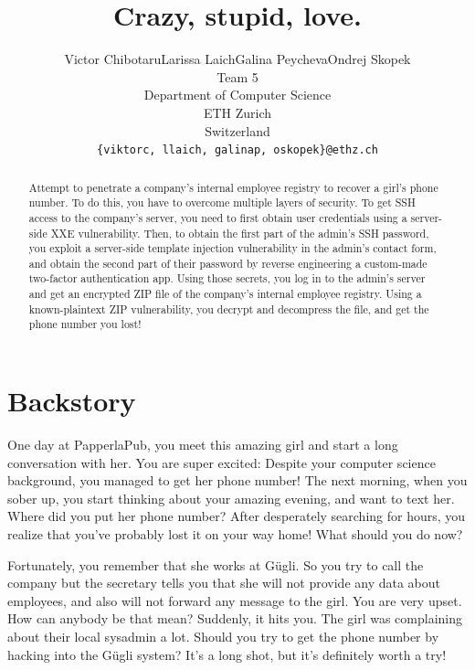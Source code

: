 \documentclass[11pt, a4paper]{article}
\begin{document}
\title{Crazy, stupid, love.}
\author{Victor Chibotaru\quad Larissa Laich\quad Galina Peycheva\quad Ondrej Skopek\\
  Team 5\\
  Department of Computer Science\\
  ETH Zurich\\
  Switzerland\\
  \texttt{\{viktorc, llaich, galinap, oskopek\}@ethz.ch}
}
\maketitle
\begin{abstract}
    Attempt to penetrate a company's internal employee registry to
    recover a girl's phone number. To do this, you have to overcome
    multiple layers of security.
	To get SSH access to the company's
    server, you need to first obtain user credentials using a server-side XXE
    vulnerability. Then, to obtain the first part of the admin's SSH password, you
    exploit a server-side template injection vulnerability in the
    admin's contact form, and obtain the second part of their password by
    reverse engineering a custom-made two-factor authentication app.
 	Using those secrets, you log in to the admin's server
    and get an encrypted ZIP file of the company's internal employee
    registry. Using a known-plaintext ZIP vulnerability, you
    decrypt and decompress the file, and get the phone number you lost!
\end{abstract}


\section{Backstory}

One day at PapperlaPub, you meet this amazing girl and start a long
conversation with her. You are super excited: Despite your computer
science background, you managed to get her phone number! The next
morning, when you sober up, you start thinking about your amazing
evening, and want to text her. Where did you put her phone number? After
desperately searching for hours, you realize that you've
probably lost it on your way home! What should you do now?

Fortunately, you remember that she works at Gügli. So you try to call
the company but the secretary tells you that she will not provide any
data about employees, and also will not forward any message to the girl.
You are very upset. How can anybody be that mean? Suddenly, it hits you.
The girl was complaining about their local sysadmin a lot. Should you
try to get the phone number by hacking into the Gügli system? It's a
long shot, but it's definitely worth a try!
\end{document}
